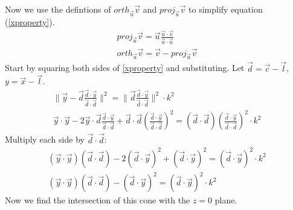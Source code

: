\documentclass[10pt]{article}
\begin{document}
\begin{appendices}
Now we use the defintions of $orth_{\vec{u}} \vec{v}$ and $proj_{\vec{u}} \vec{v}$ to simplify equation (\ref{xproperty}).
\begin{align*}
proj_{\vec{u}} \vec{v} = \vec{u} \frac{\vec{u}\cdot\vec{v}}{\vec{u}\cdot\vec{u}}\\
orth_{\vec{u}} \vec{v} = \vec{v} - proj_{\vec{u}} \vec{v}
\end{align*}
Start by squaring both sides of \ref{xproperty} and substituting. Let $\vec{d} = \vec{c}-\vec{l}$, $y = \vec{x}-\vec{l}$.
\begin{align*}
\|\vec{y} - \vec{d} \frac{\vec{d}\cdot\vec{y}}{\vec{d}\cdot\vec{d}}\|^2 = \|\vec{d} \frac{\vec{d}\cdot\vec{y}}{\vec{d}\cdot\vec{d}}\|^2 \cdot k^2\\
\vec{y}\cdot\vec{y}-2\vec{y}\cdot\vec{d} \frac{\vec{d}\cdot\vec{y}}{\vec{d}\cdot\vec{d}}+\vec{d}\cdot\vec{d}(\frac{\vec{d}\cdot\vec{y}}{\vec{d}\cdot\vec{d}})^2 = (\vec{d}\cdot\vec{d}) (\frac{\vec{d}\cdot\vec{y}}{\vec{d}\cdot\vec{d}})^2 \cdot k^2
\end{align*}
Multiply each side by $\vec{d}\cdot\vec{d}$:
\begin{align*}
(\vec{y}\cdot\vec{y})(\vec{d}\cdot\vec{d})-2(\vec{d}\cdot\vec{y})^2+(\vec{d}\cdot\vec{y})^2  = (\vec{d}\cdot\vec{y})^2 \cdot k^2\\
(\vec{y}\cdot\vec{y})(\vec{d}\cdot\vec{d})-(\vec{d}\cdot\vec{y})^2  = (\vec{d}\cdot\vec{y})^2 \cdot k^2
\end{align*}
Now we find the intersection of this cone with the $z=0$ plane.

\end{appendices}
\end{document}
